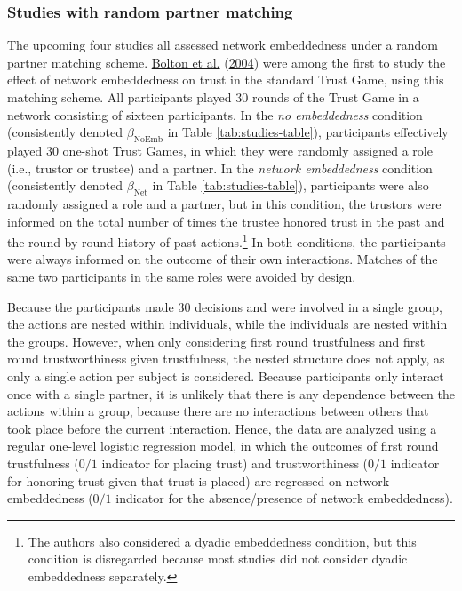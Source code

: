 \documentclass[
  11pt,
]{article}
\begin{document}
\hypertarget{studies-with-random-partner-matching}{%
\subsubsection{Studies with random partner matching}\label{studies-with-random-partner-matching}}

The upcoming four studies all assessed network embeddedness under a random partner matching scheme.
\protect\hyperlink{ref-bolton_electronic_2004}{Bolton et al.} (\protect\hyperlink{ref-bolton_electronic_2004}{2004}) were among the first to study the effect of network embeddedness on trust in the standard Trust Game, using this matching scheme.
All participants played 30 rounds of the Trust Game in a network consisting of sixteen participants.
In the \emph{no embeddedness} condition (consistently denoted \(\beta_{\text{NoEmb}}\) in Table \ref{tab:studies-table}), participants effectively played 30 one-shot Trust Games, in which they were randomly assigned a role (i.e., trustor or trustee) and a partner.
In the \emph{network embeddedness} condition (consistently denoted \(\beta_{\text{Net}}\) in Table \ref{tab:studies-table}), participants were also randomly assigned a role and a partner, but in this condition, the trustors were informed on the total number of times the trustee honored trust in the past and the round-by-round history of past actions.\footnote{The authors also considered a dyadic embeddedness condition, but this condition is disregarded because most studies did not consider dyadic embeddedness separately.}
In both conditions, the participants were always informed on the outcome of their own interactions.
Matches of the same two participants in the same roles were avoided by design.

Because the participants made 30 decisions and were involved in a single group, the actions are nested within individuals, while the individuals are nested within the groups.
However, when only considering first round trustfulness and first round trustworthiness given trustfulness, the nested structure does not apply, as only a single action per subject is considered.
Because participants only interact once with a single partner, it is unlikely that there is any dependence between the actions within a group, because there are no interactions between others that took place before the current interaction.
Hence, the data are analyzed using a regular one-level logistic regression model, in which the outcomes of first round trustfulness (\(0/1\) indicator for placing trust) and trustworthiness (\(0/1\) indicator for honoring trust given that trust is placed) are regressed on network embeddedness (\(0/1\) indicator for the absence/presence of network embeddedness).
\end{document}
